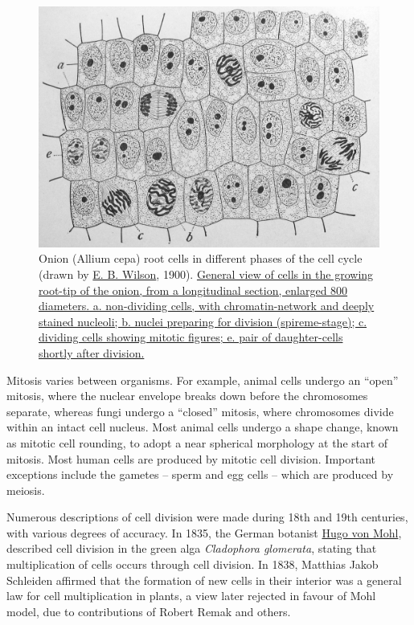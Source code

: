 \begin{figure}

{\centering \includegraphics[width=0.7\linewidth]{./figures/reproduction/Wilson1900Fig2} 

}

\caption{Onion (Allium cepa) root cells in different phases of the cell cycle (drawn by \href{https://en.wikipedia.org/wiki/Edmund_Beecher_Wilson}{E. B. Wilson}, 1900). \href{https://commons.wikimedia.org/wiki/File:Wilson1900Fig2.jpg}{General view of cells in the growing root-tip of the onion, from a longitudinal section, enlarged 800 diameters. a. non-dividing cells, with chromatin-network and deeply stained nucleoli; b. nuclei preparing for division (spireme-stage); c. dividing cells showing mitotic figures; e. pair of daughter-cells shortly after division.}}\label{fig:onionroot}
\end{figure}

Mitosis varies between organisms. For example, animal cells undergo an ``open'' mitosis, where the nuclear envelope breaks down before the chromosomes separate, whereas fungi undergo a ``closed'' mitosis, where chromosomes divide within an intact cell nucleus. Most animal cells undergo a shape change, known as mitotic cell rounding, to adopt a near spherical morphology at the start of mitosis. Most human cells are produced by mitotic cell division. Important exceptions include the gametes -- sperm and egg cells -- which are produced by meiosis.

Numerous descriptions of cell division were made during 18th and 19th centuries, with various degrees of accuracy. In 1835, the German botanist \href{https://en.wikipedia.org/wiki/Hugo_von_Mohl}{Hugo von Mohl}, described cell division in the green alga \emph{Cladophora glomerata}, stating that multiplication of cells occurs through cell division. In 1838, Matthias Jakob Schleiden affirmed that the formation of new cells in their interior was a general law for cell multiplication in plants, a view later rejected in favour of Mohl model, due to contributions of Robert Remak and others.


